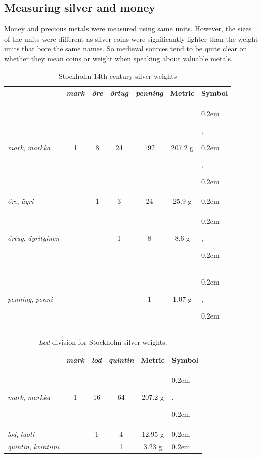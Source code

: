 \documentclass[a4paper]{article}
\newcommand{\samplefont}{\fontsize{16}{16}\abcursivefamily\spaceskip0.2em}
\newcommand{\sample}[1]{{\samplefont #1 \strut}}
\begin{document}
\subsection{Measuring silver and money}

Money and precious metals were measured using same units. However, the
sizes of the units were different as silver coins were significantly
lighter than the weight units that bore the same names. So medieval
sources tend to be quite clear on whether they mean coins or weight
when speaking about valuable metals.

\begin{table}
\begin{tabular}{lcccc|cl}
  & \emph{mark} & \emph{öre} & \emph{örtug} & \emph{penning} & Metric &
  Symbol \\
  \hline
  \emph{mark}, \emph{markka}      & 1 & 8 & 24 & 192 & 207.2 g  &
  \sample{\abmark}, \sample{\abmarc}, \sample{\abmk} \\
  \emph{öre}, \emph{äyri}         &   & 1 & 3  &  24 & 25.9 g& \sample{\abore}  \\
  \emph{örtug}, \emph{äyrityinen} &   &   & 1  &   8 & 8.6 g & \sample{\abortug}, \sample{\absolidus}  \\
  \emph{penning}, \emph{penni}    &   &   &    &   1 & 1.07 g & \sample{\abpenning}, \sample{\abdenarius}  \\
\end{tabular}
  \caption{Stockholm 14th century silver weights}
  \label{tab:old_precious_metals}
\end{table}

\begin{table}
\begin{tabular}{lccc|cl}
  & \emph{mark} & \emph{lod} & \emph{quintin} & Metric &
  Symbol \\
  \hline
  \emph{mark}, \emph{markka}      & 1 & 16 & 64 & 207.2 g   & \sample{\abmark}, \sample{\abmarc} \\
  \emph{lod}, \emph{luoti}         &   & 1 &  4 & 12.95 g & \sample{\ablod}  \\
  \emph{quintin}, \emph{kvintiini} &   &   & 1   & 3.23 g & \sample{\abquintin}  \\
\end{tabular}
\caption{\emph{Lod} division for Stockholm silver weights.}
  \label{tab:new_preciousmetals}
\end{table}
\end{document}
